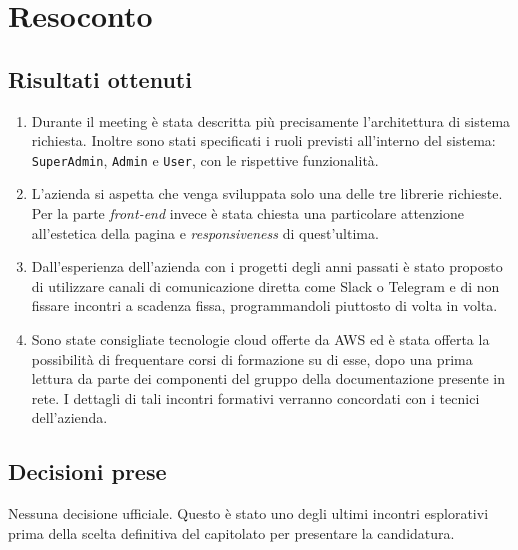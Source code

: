 \section{Resoconto}

\subsection{Risultati ottenuti}
\begin{enumerate}
    \item Durante il meeting è stata descritta più precisamente l'architettura di sistema richiesta. Inoltre sono stati specificati i ruoli previsti all'interno del sistema: \texttt{SuperAdmin}, \texttt{Admin} e \texttt{User}, con le rispettive funzionalità.
    \item L'azienda si aspetta che venga  sviluppata solo una delle tre librerie richieste. Per la parte \textit{front-end} invece è stata chiesta una particolare attenzione all'estetica della pagina e \textit{responsiveness} di quest'ultima.
    \item Dall'esperienza dell'azienda con i progetti degli anni passati è stato proposto di utilizzare canali di comunicazione diretta come Slack o Telegram e di non fissare incontri a scadenza fissa, programmandoli piuttosto di volta in volta.
    \item Sono state consigliate tecnologie cloud offerte da AWS ed è stata offerta la possibilità di frequentare corsi di formazione su di esse, dopo una prima lettura da parte dei componenti del gruppo della documentazione presente in rete. I dettagli di tali incontri formativi verranno concordati con i tecnici dell'azienda.
\end{enumerate}

\subsection{Decisioni prese}
Nessuna decisione ufficiale. Questo è stato uno degli ultimi incontri esplorativi prima della scelta definitiva del capitolato per presentare la candidatura.